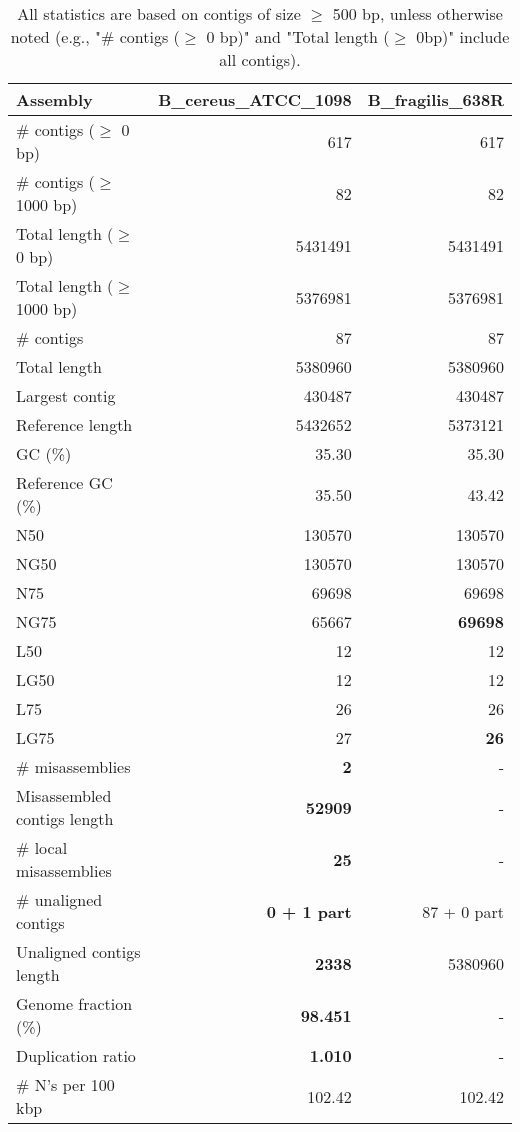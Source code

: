 \documentclass[12pt,a4paper]{article}
\begin{document}
\begin{table}[ht]
\begin{center}
\caption{All statistics are based on contigs of size $\geq$ 500 bp, unless otherwise noted (e.g., "\# contigs ($\geq$ 0 bp)" and "Total length ($\geq$ 0bp)" include all contigs).}
\begin{tabular}{|l*{2}{|r}|}
\hline
Assembly & B\_cereus\_ATCC\_1098 & B\_fragilis\_638R \\ \hline
\# contigs ($\geq$ 0 bp) & 617 & 617 \\ \hline
\# contigs ($\geq$ 1000 bp) & 82 & 82 \\ \hline
Total length ($\geq$ 0 bp) & 5431491 & 5431491 \\ \hline
Total length ($\geq$ 1000 bp) & 5376981 & 5376981 \\ \hline
\# contigs & 87 & 87 \\ \hline
Total length & 5380960 & 5380960 \\ \hline
Largest contig & 430487 & 430487 \\ \hline
Reference length & 5432652 & 5373121 \\ \hline
GC (\%) & 35.30 & 35.30 \\ \hline
Reference GC (\%) & 35.50 & 43.42 \\ \hline
N50 & 130570 & 130570 \\ \hline
NG50 & 130570 & 130570 \\ \hline
N75 & 69698 & 69698 \\ \hline
NG75 & 65667 & {\bf 69698} \\ \hline
L50 & 12 & 12 \\ \hline
LG50 & 12 & 12 \\ \hline
L75 & 26 & 26 \\ \hline
LG75 & 27 & {\bf 26} \\ \hline
\# misassemblies & {\bf 2} & - \\ \hline
Misassembled contigs length & {\bf 52909} & - \\ \hline
\# local misassemblies & {\bf 25} & - \\ \hline
\# unaligned contigs & {\bf 0 + 1 part} & 87 + 0 part \\ \hline
Unaligned contigs length & {\bf 2338} & 5380960 \\ \hline
Genome fraction (\%) & {\bf 98.451} & - \\ \hline
Duplication ratio & {\bf 1.010} & - \\ \hline
\# N's per 100 kbp & 102.42 & 102.42 \\ \hline

\end{tabular}
\end{center}
\end{table}
\end{document}
